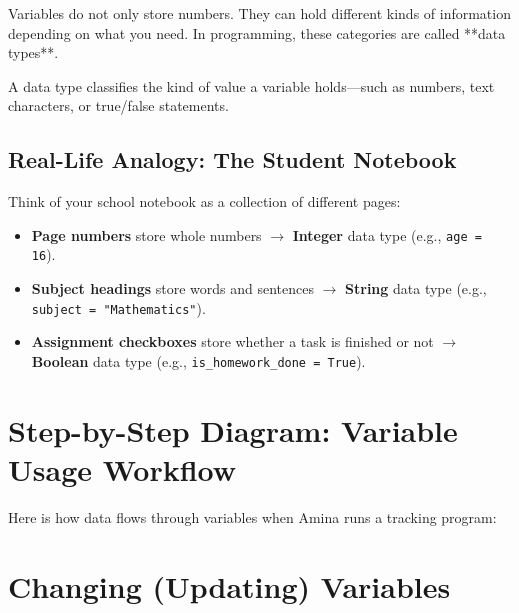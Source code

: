 Variables do not only store numbers. They can hold different kinds of information depending on what you need. In programming, these categories are called **data types**.

\begin{definition}
A data type classifies the kind of value a variable holds—such as numbers, text characters, or true/false statements.
\end{definition}

\subsection{Real-Life Analogy: The Student Notebook}
Think of your school notebook as a collection of different pages:
\begin{itemize}
    \item \textbf{Page numbers} store whole numbers $\rightarrow$ \textbf{Integer} data type (e.g., \texttt{age = 16}).
    \item \textbf{Subject headings} store words and sentences $\rightarrow$ \textbf{String} data type (e.g., \texttt{subject = "Mathematics"}).
    \item \textbf{Assignment checkboxes} store whether a task is finished or not $\rightarrow$ \textbf{Boolean} data type (e.g., \texttt{is\_homework\_done = True}).
\end{itemize}

\section{Step-by-Step Diagram: Variable Usage Workflow}

Here is how data flows through variables when Amina runs a tracking program:

\begin{center}
\end{center}

\section{Changing (Updating) Variables}

